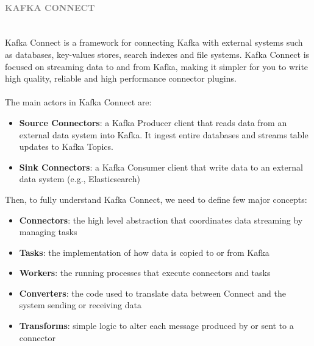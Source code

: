 \documentclass[10pt,a4paper]{article}
\newcommand{\nline}{\\~\\}
\newcommand{\myparagraph}[1]{\paragraph{\normalsize{\textcolor{gray}{\uppercase{\textbf{#1}}}} }\mbox{} \vspace{0.5em}\\}
\begin{document}
\myparagraph{Kafka Connect}
Kafka Connect is a framework for connecting Kafka with external systems such as databases, key-values stores, search indexes and file systems. Kafka Connect is focused on streaming data to and from Kafka, making it simpler for you to write high quality, reliable and high performance connector plugins.
\nline
The main actors in Kafka Connect are:
\begin{itemize}
	\item \textbf{Source Connectors}: a Kafka Producer client that reads data from an external data system into Kafka. It ingest entire databases and streams table updates to Kafka Topics. 
	\item \textbf{Sink Connectors}: a Kafka Consumer client that write data to an external data system (e.g., Elasticsearch)
\end{itemize}
Then, to fully understand Kafka Connect, we need to define few major concepts:
\begin{itemize}
	\item \textbf{Connectors}: the high level abstraction that coordinates data streaming by managing tasks
	\item \textbf{Tasks}: the implementation of how data is copied to or from Kafka
	\item \textbf{Workers}: the running processes that execute connectors and tasks
	\item \textbf{Converters}: the code used to translate data between Connect and the system sending or receiving data
	\item \textbf{Transforms}: simple logic to alter each message produced by or sent to a connector
\end{itemize}
\end{document}
